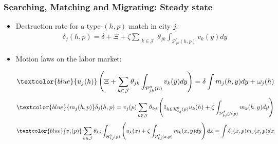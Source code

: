 \documentclass{beamer}
\newcommand{\1}{\mathbb{1}}
\newcommand{\J}{\mathcal{J}}
\newcommand{\sumktot}{\sum_{\substack{k \in \J}}}
\begin{document}
\begin{frame}\frametitle{Searching, Matching and Migrating: Steady state}
\begin{itemize}
\item Destruction rate for a type-$(h,p)$ match in city $j$:
\small
\begin{eqnarray*}
&&\delta_j(h,p)=\delta+\Xi+\zeta\sumktot\theta_{jk}\int_{\mathcal{P}^c_{jk}(h,p)} v_k(y)dy
\end{eqnarray*}\normalsize
\item Motion laws on the labor market:
\small
\vspace{-0.2cm}
\centering
\begin{footnotesize}
\begin{eqnarray*}
\textcolor{blue}{u_j(h)}\left(\Xi+\sumktot \theta_{jk}  \int_{\mathcal{P}^0_{jk}(h)}v_k(y)dy\right)=\delta \int m_j(h,y)dy+\omega_j(h)
\end{eqnarray*}
\vspace{-0.5cm}
\begin{eqnarray*}
\textcolor{blue}{m_j(h,p)}\delta_j(h,p) = v_j(p)\sumktot \theta_{kj}\left(1_{h\in\mathcal{H}^0_{kj}(p)}u_k(h) + \zeta  \int_{\mathcal{P}^f_{kj}(h,p)} m_k(h,y)dy\right)
\end{eqnarray*}
\vspace{-0.5cm}
\begin{eqnarray*}
\textcolor{blue}{v_j(p)}\sumktot\theta_{kj}\int_{\mathcal{H}^0_{kj}(p)} \left(u_k(x)+\zeta\int_{\mathcal{P}^f_{kj}(x,p)}m_k(x,y)dy\right)dx=\int \delta_j(x,p)m_j(x,p)dx
\end{eqnarray*}
\end{footnotesize}

\end{itemize}
\end{frame}
\end{document}
